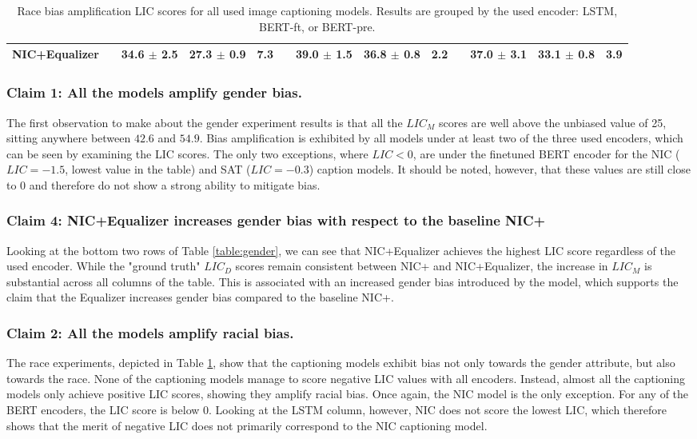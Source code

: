 \begin{table}[ht]
\begin{adjustbox}{width=\columnwidth,center}
\begin{tabular}{@{}lllllllllllll@{}}
NIC+Equalizer           &  & 34.6 $\pm$ 2.5  & 27.3 $\pm$ 0.9 & 7.3    &  & 39.0 $\pm$ 1.5  & 36.8 $\pm$ 0.8 & 2.2 &  & 37.0 $\pm$ 3.1  & 33.1 $\pm$ 0.8 & 3.9 

\\\bottomrule
    \end{tabular}
    \end{adjustbox}
    \caption{Race bias amplification LIC scores for all used image captioning models. Results are grouped by the used encoder: LSTM, BERT-ft, or BERT-pre.}
    \label{table:race}
    \end{table}

\subsubsection{Claim 1: All the models amplify gender bias.}
The first observation to make about the gender experiment results is that all the $LIC_M$ scores are well above the unbiased value of 25, sitting anywhere between $42.6$ and $54.9$. Bias amplification is exhibited by all models under at least two of the three used encoders, which can be seen by examining the LIC scores. The only two exceptions, where $LIC<0$, are under the finetuned BERT encoder for the NIC ($LIC=-1.5$, lowest value in the table) and SAT ($LIC=-0.3$) caption models. It should be noted, however, that these values are still close to 0 and therefore do not show a strong ability to mitigate bias.

\subsubsection{Claim 4: NIC+Equalizer increases gender bias with respect to the baseline NIC+}
Looking at the bottom two rows of Table \ref{table:gender}, we can see that NIC+Equalizer achieves the highest LIC score regardless of the used encoder. While the "ground truth" $LIC_D$ scores remain consistent between NIC+ and NIC+Equalizer, the increase in $LIC_M$ is substantial across all columns of the table. This is associated with an increased gender bias introduced by the model, which supports the claim that the Equalizer increases gender bias compared to the baseline NIC+.

\subsubsection{Claim 2: All the models amplify racial bias.}
The race experiments, depicted in Table \ref{table:race}, show that the captioning models exhibit bias not only towards the gender attribute, but also towards the race. None of the captioning models manage to score negative LIC values with all encoders. Instead, almost all the captioning models only achieve positive LIC scores, showing they amplify racial bias. Once again, the NIC model is the only exception. For any of the BERT encoders, the LIC score is below 0. Looking at the LSTM column, however, NIC does not score the lowest LIC, which therefore shows that the merit of negative LIC does not primarily correspond to the NIC captioning model.


